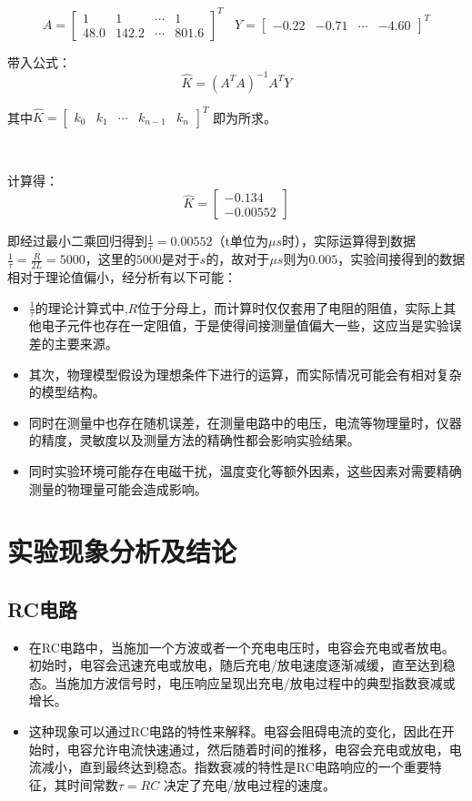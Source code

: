 \documentclass{ctexart}
\begin{document}
$$ 
A = {\begin{bmatrix}
    1 & 1 & \cdots & 1 \\
    48.0 & 142.2 & \cdots & 801.6 
 \end{bmatrix}}^T \ \ \ \
  Y = {\begin{bmatrix} -0.22  & -0.71 & \cdots & -4.60 \end{bmatrix}}^T
$$

带入公式：
$$ 
\widehat{K} = {(A^T A)}^{-1} A^T Y 
$$

其中$ \widehat{K} = {\begin{bmatrix} k_0  & k_1 & \cdots & k_{n-1} & k_{n} \end{bmatrix}}^T $ 即为所求。

~

计算得：
$$\widehat{K} = \begin{bmatrix}   -0.134 \\ -0.00552 \end{bmatrix} $$

即经过最小二乘回归得到$\frac{1}{\tau} = 0.00552 $（t单位为$\mu s$时），实际运算得到数据$\frac{1}{\tau} = \frac{R}{2L} = 5000$，这里的$5000$是对于$s$的，故对于$\mu s$则为$0.005$，实验间接得到的数据相对于理论值偏小，经分析有以下可能：

\begin{itemize}
    \item $\frac{1}{\tau}$的理论计算式中,$R$位于分母上，而计算时仅仅套用了电阻的阻值，实际上其他电子元件也存在一定阻值，于是使得间接测量值偏大一些，这应当是实验误差的主要来源。
    \item 其次，物理模型假设为理想条件下进行的运算，而实际情况可能会有相对复杂的模型结构。
    \item 同时在测量中也存在随机误差，在测量电路中的电压，电流等物理量时，仪器的精度，灵敏度以及测量方法的精确性都会影响实验结果。
    \item 同时实验环境可能存在电磁干扰，温度变化等额外因素，这些因素对需要精确测量的物理量可能会造成影响。
\end{itemize}

\newpage

\section{实验现象分析及结论}
\subsection{RC电路}

\begin{itemize}
    \item 在RC电路中，当施加一个方波或者一个充电电压时，电容会充电或者放电。初始时，电容会迅速充电或放电，随后充电/放电速度逐渐减缓，直至达到稳态。当施加方波信号时，电压响应呈现出充电/放电过程中的典型指数衰减或增长。
    \item 这种现象可以通过RC电路的特性来解释。电容会阻碍电流的变化，因此在开始时，电容允许电流快速通过，然后随着时间的推移，电容会充电或放电，电流减小，直到最终达到稳态。指数衰减的特性是RC电路响应的一个重要特征，其时间常数$\tau = RC$ 决定了充电/放电过程的速度。
\end{itemize}
\end{document}
